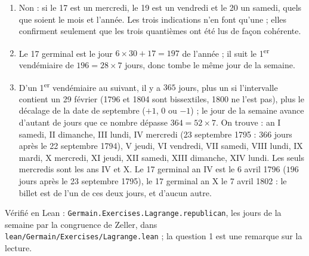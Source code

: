 \documentclass[11pt,a4paper]{article}
\begin{document}
\begin{solution}
\begin{enumerate}
\item Non : si le 17 est un mercredi, le 19 est un vendredi et le 20 un samedi,
  quels que soient le mois et l'année. Les trois indications n'en font qu'une ; elles
  confirment seulement que les trois quantièmes ont été lus de façon cohérente.
\item Le 17 germinal est le jour $6\times30 + 17 = 197$ de l'année ; il suit le
  1\textsuperscript{er} vendémiaire de $196 = 28\times 7$ jours, donc tombe le même
  jour de la semaine.
\item D'un 1\textsuperscript{er} vendémiaire au suivant, il y a $365$ jours, plus un
  si l'intervalle contient un 29 février (1796 et 1804 sont bissextiles, 1800 ne l'est
  pas), plus le décalage de la date de septembre ($+1$, $0$ ou $-1$) ; le jour de la
  semaine avance d'autant de jours que ce nombre dépasse $364 = 52\times7$. On trouve : an I samedi, II dimanche, III lundi, IV mercredi (23 septembre 1795 :
  $366$ jours après le 22 septembre 1794), V jeudi, VI vendredi, VII samedi,
  VIII lundi, IX mardi, X mercredi, XI jeudi, XII samedi, XIII dimanche, XIV lundi. Les
  seuls mercredis sont les ans IV et X. Le 17 germinal an IV est le 6 avril 1796
  ($196$ jours après le 23 septembre 1795), le 17 germinal an X le 7 avril 1802 : le
  billet est de l'un de ces deux jours, et d'aucun autre.
\end{enumerate}

Vérifié en Lean : \texttt{Germain.Exercises.Lagrange.republican}, les jours de la semaine par
la congruence de Zeller, dans \texttt{lean/Germain/Exercises/Lagrange.lean} ; la question 1 est une remarque sur la
lecture.
\end{solution}
\end{document}
